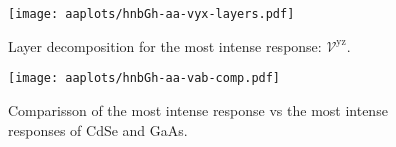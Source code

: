\documentclass{article}
\begin{document}
\begin{figure}[ht]
    \centering
    \texttt{[image: aaplots/hnbGh-aa-vyx-layers.pdf]}
    \caption{Layer decomposition for the most intense response:
    $\mathcal{V}^{\mathrm{yz}}$.}
    \label{fig:aa-lay}
\end{figure}

\begin{figure}[ht]
    \centering
    \texttt{[image: aaplots/hnbGh-aa-vab-comp.pdf]}
    \caption{Comparisson of the most intense response vs the most intense
    responses of CdSe and GaAs.}
    \label{fig:aa-comp}
\end{figure}


\end{document}
